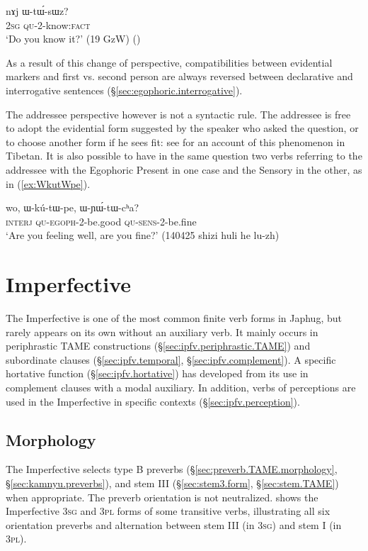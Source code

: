 \begin{exe}
\ex \label{ex:WtWsWz}
\gll nɤj ɯ-tɯ́-sɯz? \\
\textsc{2sg} \textsc{qu}-2-know:\textsc{fact} \\
\glt `Do you know it?' (19 GzW)  ()
\end{exe} 

As a result of this change of perspective, compatibilities between evidential markers and first vs. second person are always reversed between declarative and interrogative sentences  (§\ref{sec:egophoric.interrogative}).

The addressee perspective however is not a syntactic rule. The addressee is free to adopt the evidential form suggested by the speaker who asked the question, or to choose another form if he sees fit: see \citet{garrett07symbiosis} for an account of this phenomenon in Tibetan. It is also possible to have in the same question two verbs referring to the addressee with the Egophoric Present in one case and the Sensory in the other, as in (\ref{ex:WkutWpe}). 

\begin{exe}
\ex \label{ex:WkutWpe}
\gll wo, ɯ-kú-tɯ-pe, ɯ-ɲɯ́-tɯ-cʰa? \\
\textsc{interj} \textsc{qu}-\textsc{egoph}-2-be.good \textsc{qu}-\textsc{sens}-2-be.fine \\
\glt `Are you feeling well, are you fine?' (140425 shizi huli he lu-zh)
\end{exe}

  \section{Imperfective} \label{sec:imperfective}
 The Imperfective is one of the most common finite verb forms in Japhug, but rarely appears on its own without an auxiliary verb. It mainly occurs in periphrastic TAME constructions (§\ref{sec:ipfv.periphrastic.TAME}) and subordinate clauses (§\ref{sec:ipfv.temporal}, §\ref{sec:ipfv.complement}). A specific hortative function (§\ref{sec:ipfv.hortative}) has developed from its use in complement clauses with a modal auxiliary. In addition, verbs of perceptions are used in the Imperfective in specific contexts (§\ref{sec:ipfv.perception}).
  
  
  \subsection{Morphology} \label{sec:ipfv.morphology}
The Imperfective selects type B preverbs (§\ref{sec:preverb.TAME.morphology}, §\ref{sec:kamnyu.preverbs}), and stem III (§\ref{sec:stem3.form}, §\ref{sec:stem.TAME}) when appropriate. The preverb orientation is not neutralized.  shows the Imperfective \textsc{3sg}\flobv{} and \textsc{3pl}\flobv{} forms of some transitive verbs, illustrating all six orientation preverbs and alternation between stem III (in \textsc{3sg}\flobv{}) and stem I (in \textsc{3pl}\flobv{}).
 
